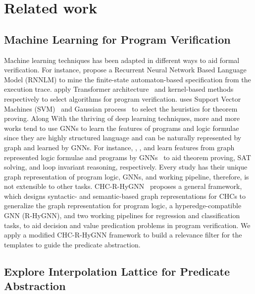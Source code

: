 


\section{Related work}
\subsection{Machine Learning for Program Verification}
Machine learning techniques has been adapted in different ways to aid formal verification. 
%
For instance, \cite{10.1145/3213846.3213876} propose a Recurrent Neural Network Based Language Model (RNNLM) to mine the finite-state automaton-based specification from the execution trace. 
%
\cite{9286080,Richter2020-yh} apply Transformer architecture~\cite{vaswani2017attention} and kernel-based methods~\cite{kernelMethods} respectively to select algorithms for program verification.
%
\cite{heuristicSelectionForTP} uses Support Vector Machines (SVM)~\cite{cortes1995support} and Gaussian process~\cite{10.5555/1162254} to select the heuristics for theorem proving.
%
Along With the thriving of deep learning techniques, more and more works tend to use GNNs to learn the features of programs and logic formulae since they are highly structured language and can be naturally represented by graph and learned by GNNs.
%
For instance, \cite{NIPS2017_6871,DBLP:journals/corr/abs-1905-10006}, \cite{DBLP:journals/corr/abs-1903-04671,DBLP:journals/corr/abs-1802-03685}, and \cite{Si2018LearningLI} learn features from graph represented logic formulae and programs by GNNs~\cite{DBLP:journals/corr/GilmerSRVD17,4700287,li2017gated} to aid theorem proving, SAT solving, and loop invariant reasoning, respectively. 
%
Every study has their unique graph representation of program logic, GNNs, and working pipeline, therefore, is not extensible to other tasks.
%
CHC-R-HyGNN~\cite{tech-report} proposes a general framework, which designs syntactic- and semantic-based graph representations for CHCs to generalize the graph representation for program logic, a hyperedge-compatible GNN (R-HyGNN), and two working pipelines for regression and classification tasks, to aid decision and value predication problems in program verification.
%
We apply a modified CHC-R-HyGNN framework to build a relevance filter for the templates to guide the predicate abstraction. 

\subsection{Explore Interpolation Lattice for Predicate Abstraction}









